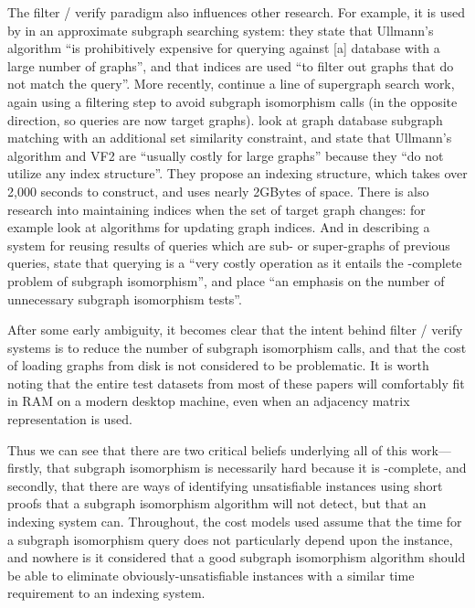 \documentclass[twoside,11pt]{article}
\newcommand{\citet}[1]{\citeA{#1}}
\begin{document}
The filter / verify paradigm also influences other research. For example, it is used by
\citet{DBLP:conf/icde/TianP08} in an approximate subgraph searching system: they state that
Ullmann's algorithm ``is prohibitively expensive for querying against [a] database with a large
number of graphs'', and that indices are used ``to filter out graphs that do not match the query''.
More recently, \citet{DBLP:journals/pvldb/YuanMG13} continue a line of supergraph search work, again
using a filtering step to avoid subgraph isomorphism calls (in the opposite direction, so queries
are now target graphs). \citet{DBLP:journals/tkde/HongZLY15} look at graph database subgraph
matching with an additional set similarity constraint, and state that Ullmann's algorithm and VF2
are ``usually costly for large graphs'' because they ``do not utilize any index structure''. They
propose an indexing structure, which takes over 2,000 seconds to construct, and uses nearly 2GBytes
of space.  There is also research into maintaining indices when the set of target graph changes: for
example \citet{DBLP:conf/sigmod/YuanMYG15} look at algorithms for updating graph indices. And in
describing a system for reusing results of queries which are sub- or super-graphs of previous
queries, \citet{DBLP:conf/edbt/WangNT16} state that querying is a ``very costly operation as it
entails the \NP-complete problem of subgraph isomorphism'', and place ``an emphasis on the number of
unnecessary subgraph isomorphism tests''.

After some early ambiguity, it becomes clear that the intent behind filter / verify systems is to
reduce the number of subgraph isomorphism calls, and that the cost of loading graphs from disk is
not considered to be problematic. It is worth noting that the entire test datasets from most of
these papers will comfortably fit in RAM on a modern desktop machine, even when an adjacency matrix
representation is used.

Thus we can see that there are two critical beliefs underlying all of this work---firstly, that
subgraph isomorphism is necessarily hard because it is \NP-complete, and secondly, that there are
ways of identifying unsatisfiable instances using short proofs that a subgraph isomorphism algorithm
will not detect, but that an indexing system can. Throughout, the cost models used assume that the
time for a subgraph isomorphism query does not particularly depend upon the instance, and nowhere is
it considered that a good subgraph isomorphism algorithm should be able to eliminate
obviously-unsatisfiable instances with a similar time requirement to an indexing system.
\end{document}
